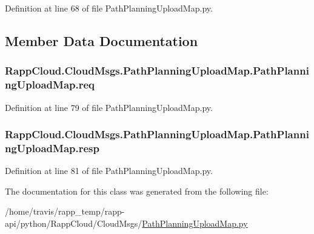 Definition at line 68 of file Path\-Planning\-Upload\-Map.\-py.



\subsection{Member Data Documentation}
\hypertarget{classRappCloud_1_1CloudMsgs_1_1PathPlanningUploadMap_1_1PathPlanningUploadMap_ac239cfaccab859b62ec50d0814e9a0ca}{
\subsubsection[{req}]{\setlength{\rightskip}{0pt plus 5cm}Rapp\-Cloud.\-Cloud\-Msgs.\-Path\-Planning\-Upload\-Map.\-Path\-Planning\-Upload\-Map.\-req}}\label{classRappCloud_1_1CloudMsgs_1_1PathPlanningUploadMap_1_1PathPlanningUploadMap_ac239cfaccab859b62ec50d0814e9a0ca}


Definition at line 79 of file Path\-Planning\-Upload\-Map.\-py.

\hypertarget{classRappCloud_1_1CloudMsgs_1_1PathPlanningUploadMap_1_1PathPlanningUploadMap_a2047647bd04b9d19a2079d327e92214a}{
\subsubsection[{resp}]{\setlength{\rightskip}{0pt plus 5cm}Rapp\-Cloud.\-Cloud\-Msgs.\-Path\-Planning\-Upload\-Map.\-Path\-Planning\-Upload\-Map.\-resp}}\label{classRappCloud_1_1CloudMsgs_1_1PathPlanningUploadMap_1_1PathPlanningUploadMap_a2047647bd04b9d19a2079d327e92214a}


Definition at line 81 of file Path\-Planning\-Upload\-Map.\-py.



The documentation for this class was generated from the following file\-:\begin{DoxyCompactItemize}
\item 
/home/travis/rapp\-\_\-temp/rapp-\/api/python/\-Rapp\-Cloud/\-Cloud\-Msgs/\hyperlink{PathPlanningUploadMap_8py}{Path\-Planning\-Upload\-Map.\-py}\end{DoxyCompactItemize}
